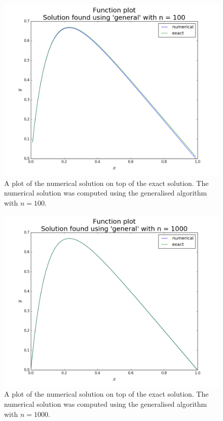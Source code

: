 \documentclass[reprint,english]{revtex4-1}
\begin{document}
\begin{figure}[ht]
\centering
\includegraphics[scale=0.274]{figures/general_100_funcplot.png}
\caption{A plot of the numerical solution on top of the exact solution. The numerical solution was computed using the generalised algorithm with \(n=100\).}\label{fig:gen_alg_n100}
\end{figure}

\begin{figure}[h!]
\centering
\includegraphics[scale=0.274]{figures/general_1000_funcplot.png}
\caption{A plot of the numerical solution on top of the exact solution. The numerical solution was computed using the generalised algorithm with \(n=1000\).}\label{fig:gen_alg_n1000}
\end{figure}
\end{document}
